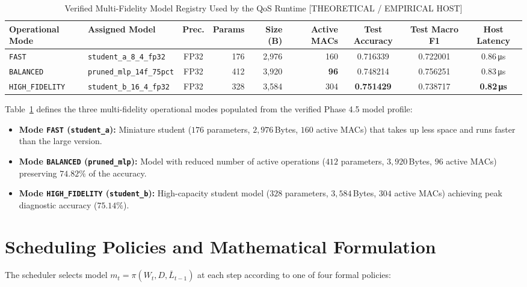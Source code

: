 \documentclass[journal]{IEEEtran}
\begin{document}
\begin{table}[t]
\centering
\footnotesize
\setlength{\tabcolsep}{3.5pt}
\caption{Verified Multi-Fidelity Model Registry Used by the QoS Runtime [THEORETICAL / EMPIRICAL HOST]}
\label{tab:registry}
\begin{tabular}{l l c r r r c c c}
\toprule
\textbf{Operational Mode} & \textbf{Assigned Model} & \textbf{Prec.} & \textbf{Params} & \textbf{Size (B)} & \textbf{Active MACs} & \textbf{Test Accuracy} & \textbf{Test Macro F1} & \textbf{Host Latency} \\
\midrule
\texttt{FAST} & \texttt{student\_a\_8\_4\_fp32} & FP32 & 176 & 2,976 & 160 & 0.716339 & 0.722001 & 0.86\,\si{\micro\second} \\
\texttt{BALANCED} & \texttt{pruned\_mlp\_14f\_75pct} & FP32 & 412 & 3,920 & \textbf{96} & 0.748214 & 0.756251 & 0.83\,\si{\micro\second} \\
\texttt{HIGH\_FIDELITY} & \texttt{student\_b\_16\_4\_fp32} & FP32 & 328 & 3,584 & 304 & \textbf{0.751429} & 0.738717 & \textbf{0.82\,\si{\micro\second}} \\
\bottomrule
\end{tabular}%
\end{table}

Table~\ref{tab:registry} defines the three multi-fidelity operational modes populated from the verified Phase 4.5 model profile:
\begin{itemize}
    \item \textbf{Mode \texttt{FAST} (\texttt{student\_a}):} Miniature student ($176$ parameters, $2,976$\,Bytes, $160$ active MACs) that takes up less space and runs faster than the large version.
    \item \textbf{Mode \texttt{BALANCED} (\texttt{pruned\_mlp}):} Model with reduced number of active operations ($412$ parameters, $3,920$\,Bytes, $96$ active MACs) preserving $74.82\%$ of the accuracy.
    \item \textbf{Mode \texttt{HIGH\_FIDELITY} (\texttt{student\_b}):} High-capacity student model ($328$ parameters, $3,584$\,Bytes, $304$ active MACs) achieving peak diagnostic accuracy ($75.14\%$).
\end{itemize}

\section{Scheduling Policies and Mathematical Formulation}
The scheduler selects model $m_t = \pi(W_t, D, \bar{L}_{t-1})$ at each step according to one of four formal policies:
\end{document}
